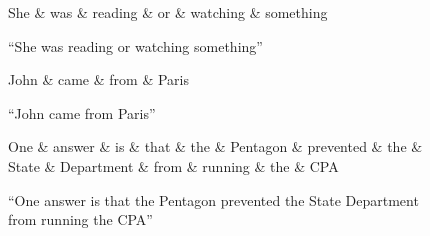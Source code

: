 \documentclass[11pt,a4paper]{article}
\begin{document}
\begin{figure}[h]
    \centering
    \begin{dependency}
    \begin{deptext}[column sep=1em]
    She \& was \& reading \& or \& watching \& something  \\
    \end{deptext}
    \end{dependency}
    \caption{``She was reading or watching something''}
    \label{fig:reading-or-watching}
\end{figure}

\begin{figure}[h]
    \centering
    \begin{dependency}
    \begin{deptext}[column sep=1em]
    John \& came \& from \& Paris  \\
    \end{deptext}
    \end{dependency}
    \caption{``John came from Paris''}
    \label{fig:john-paris}
\end{figure}


\begin{figure*}[h]
    \centering
    \begin{dependency}
    \begin{deptext}[column sep=0.1cm]
    One \& answer \& is \& that \& the \& Pentagon \& prevented \& the \& State \& Department \& from \& running \& the \& CPA  \\
    \end{deptext}
    \end{dependency}
    \caption{``One answer is that the Pentagon prevented the State Department from running the CPA''}
    \label{fig:rel-clause}
\end{figure*}
\end{document}
